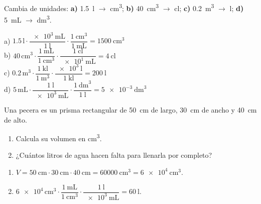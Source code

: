 \begin{exercise}
    Cambia de unidades: \textbf{a)} \qty{1.5}{\litre} \(\to\) \unit{\cubic\cm}; \textbf{b)} \qty{40}{\cubic\cm} \(\to\) \unit{\centi\litre}; \textbf{c)} \qty{0.2}{\cubic\m} \(\to\) \unit{\litre}; \textbf{d)} \qty{5}{\mL} \(\to\) \unit{\cubic\dm}.
    \begin{solu}
        a) \(\num{1.5}\,\unit{\litre} \cdot \dfrac{\qty{e3}{\mL}}{\qty{1}{\litre}} \cdot \dfrac{\qty{1}{\cubic\cm}}{\qty{1}{\mL}} = \qty{1500}{\cubic\cm}\) \\
        b) \(\num{40}\,\unit{\cubic\cm} \cdot \dfrac{\qty{1}{\mL}}{\qty{1}{\cubic\cm}} \cdot \dfrac{\qty{1}{\centi\litre}}{\qty{e1}{\mL}} = \qty{4}{\centi\litre}\) \\
        c) \(\num{0.2}\,\unit{\cubic\m} \cdot \dfrac{\qty{1}{\kilo\litre}}{\qty{1}{\cubic\m}} \cdot \dfrac{\qty{e3}{\litre}}{\qty{1}{\kilo\litre}} = \qty{200}{\litre}\) \\
        d) \(\num{5}\,\unit{\mL} \cdot \dfrac{\qty{1}{\litre}}{\qty{e3}{\mL}} \cdot \dfrac{\qty{1}{\cubic\dm}}{\qty{1}{\litre}} = \qty{5e-3}{\cubic\dm}\)
    \end{solu}
\end{exercise}

\begin{exercise}
    Una pecera es un prisma rectangular de \qty{50}{\cm} de largo, \qty{30}{\cm} de ancho y \qty{40}{\cm} de alto.
    \begin{enumerate}[label=\letraminuscula]
        \item Calcula su volumen en \unit{\cubic\cm}.
        \item ¿Cuántos litros de agua hacen falta para llenarla por completo?
    \end{enumerate}
    \begin{solu}
        \begin{enumerate}[label=\alph*)]
            \item \(V = \qty{50}{\cm} \cdot \qty{30}{\cm} \cdot \qty{40}{\cm} = \qty{60000}{\cubic\cm} = \qty{6e4}{\cubic\cm}\).
            \item \(\num{6e4}\,\unit{\cubic\cm} \cdot \dfrac{\qty{1}{\mL}}{\qty{1}{\cubic\cm}} \cdot \dfrac{\qty{1}{\litre}}{\qty{e3}{\mL}} = \qty{60}{\litre}\).
        \end{enumerate}
    \end{solu}
\end{exercise}

